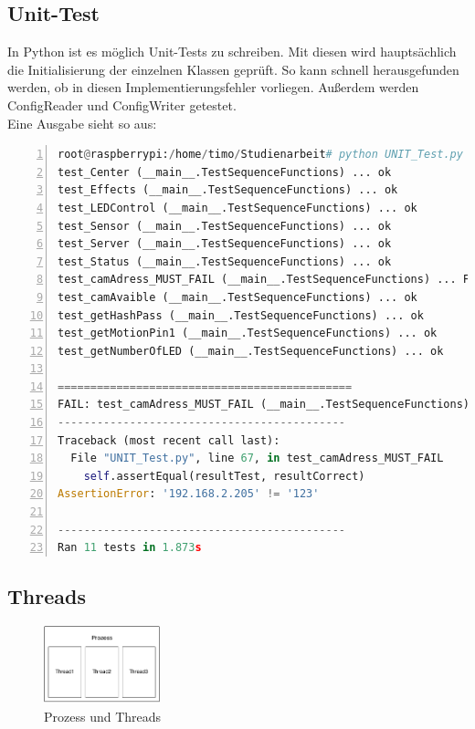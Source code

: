 \subsection{Unit-Test}
In Python ist es möglich Unit-Tests zu schreiben. Mit diesen wird hauptsächlich die Initialisierung der einzelnen Klassen geprüft. So kann schnell herausgefunden werden, ob in diesen Implementierungsfehler vorliegen. Außerdem werden ConfigReader und ConfigWriter getestet. \\
Eine Ausgabe sieht so aus:

\begin{lstlisting}[caption=Ausgabe der Klasse UNIT\_Test, language=python, frame=single, breaklines=true,columns=fullflexible, commentstyle=\color{gray}\upshape, captionpos=b, numbers = left]
root@raspberrypi:/home/timo/Studienarbeit# python UNIT_Test.py 
test_Center (__main__.TestSequenceFunctions) ... ok
test_Effects (__main__.TestSequenceFunctions) ... ok
test_LEDControl (__main__.TestSequenceFunctions) ... ok
test_Sensor (__main__.TestSequenceFunctions) ... ok
test_Server (__main__.TestSequenceFunctions) ... ok
test_Status (__main__.TestSequenceFunctions) ... ok
test_camAdress_MUST_FAIL (__main__.TestSequenceFunctions) ... FAIL
test_camAvaible (__main__.TestSequenceFunctions) ... ok
test_getHashPass (__main__.TestSequenceFunctions) ... ok
test_getMotionPin1 (__main__.TestSequenceFunctions) ... ok
test_getNumberOfLED (__main__.TestSequenceFunctions) ... ok

=============================================
FAIL: test_camAdress_MUST_FAIL (__main__.TestSequenceFunctions)
--------------------------------------------
Traceback (most recent call last):
  File "UNIT_Test.py", line 67, in test_camAdress_MUST_FAIL
    self.assertEqual(resultTest, resultCorrect)
AssertionError: '192.168.2.205' != '123'

--------------------------------------------
Ran 11 tests in 1.873s
\end{lstlisting}
\subsection{Threads}

\begin{figure}
	\vspace{-20pt}
	\begin{center}
		\includegraphics[width=0.3\textwidth]{./data/Threads.png}
	\end{center}
	\vspace{-20pt}
	\caption{Prozess und Threads}
	\vspace{-10pt}
\end{figure}

